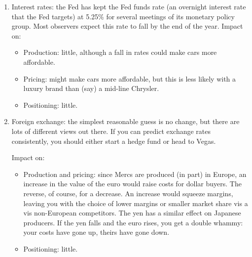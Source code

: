 \documentclass[letterpaper,12pt]{article}
\begin{document}
\begin{enumerate}
\item Interest rates:  the Fed has kept the Fed funds rate 
(an overnight interest rate that the Fed targets) 
at 5.25\% for several meetings of its monetary policy group.  
Most observers expect this rate to fall by the end of the year.  
Impact on:
\begin{itemize}
\item Production:  little, although a fall in rates
could make cars more affordable.  
\item Pricing:  might make cars more affordable, 
but this is less likely with a luxury brand than (say) a 
mid-line Chrysler.  
\item Positioning:  little.  
\end{itemize}

\item Foreign exchange:  the simplest reasonable guess is no change, 
but there are lots of different views out there.  
If you can predict exchange rates consistently, 
you should either start a hedge fund or head to Vegas.  

Impact on:
\begin{itemize}
\item Production and pricing:  since Mercs are produced (in part) in Europe, 
an increase in the value of the euro would raise costs for dollar buyers.  
The reverse, of course, for a decrease.  
An increase would squeeze margins, leaving you with the choice of 
lower margins or smaller market share vis a vis non-European competitors.  
The yen has a similar effect on Japanese producers.  
If the yen falls and the euro rises, you get a double whammy:  
your costs have gone up, theirs have gone down.  
\item Positioning:  little.  
\end{itemize}

\end{enumerate}
\end{document}
